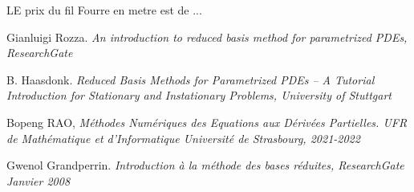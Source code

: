 \documentclass[12pt]{article}
\begin{document}
LE prix du fil Fourre en metre est de ...


\begin{thebibliography}{9}

Gianluigi Rozza.  \emph{An introduction to reduced basis method for parametrized PDEs, ResearchGate}

B. Haasdonk.  \emph{Reduced Basis Methods for Parametrized PDEs –
A Tutorial Introduction for Stationary and
Instationary Problems, University of Stuttgart  } 



Bopeng RAO,  \emph{ Méthodes Numériques
des Equations aux Dérivées Partielles. UFR de Mathématique et d’Informatique
Université de Strasbourg, 2021-2022 }

Gwenol Grandperrin.  \emph{Introduction à la méthode des bases réduites, ResearchGate Janvier 2008 }

\end{thebibliography}
\end{document}
